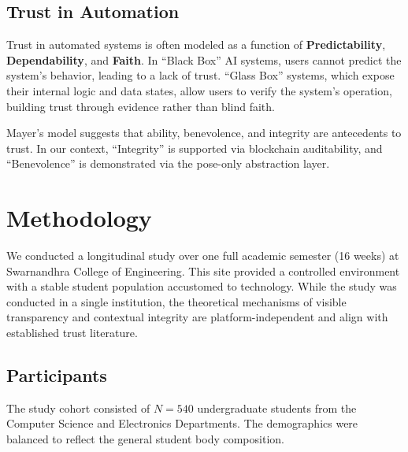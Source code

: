 \documentclass[conference]{IEEEtran}
\begin{document}
\subsection{Trust in Automation}
Trust in automated systems is often modeled as a function of \textbf{Predictability}, \textbf{Dependability}, and \textbf{Faith}. In ``Black Box'' AI systems, users cannot predict the system's behavior, leading to a lack of trust. ``Glass Box'' systems, which expose their internal logic and data states, allow users to verify the system's operation, building trust through evidence rather than blind faith.

Mayer's model \cite{b6} suggests that ability, benevolence, and integrity are antecedents to trust. In our context, ``Integrity'' is supported via blockchain auditability, and ``Benevolence'' is demonstrated via the pose-only abstraction layer.

\section{Methodology}

We conducted a longitudinal study over one full academic semester (16 weeks) at Swarnandhra College of Engineering. This site provided a controlled environment with a stable student population accustomed to technology. While the study was conducted in a single institution, the theoretical mechanisms of visible transparency and contextual integrity are platform-independent and align with established trust literature.

\subsection{Participants}
The study cohort consisted of $N=540$ undergraduate students from the Computer Science and Electronics Departments. The demographics were balanced to reflect the general student body composition.
\end{document}
